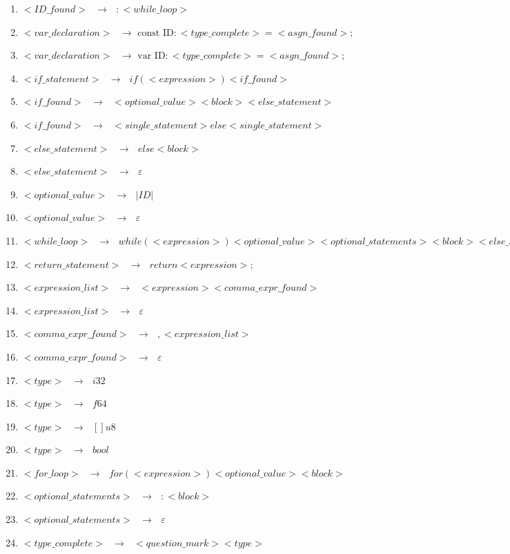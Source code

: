 \documentclass[12pt]{article}
\begin{document}
\begin{enumerate}
\item $<ID\_found> \text{ }\to \text{ } : <while\_loop>$
\item $<var\_declaration> \text{ }\to \text{ const ID} : <type\_complete> = <asgn\_found> ;$
\item $<var\_declaration> \text{ }\to \text{ var ID} : <type\_complete> = <asgn\_found> ;$
\item $<if\_statement> \text{ }\to \text{ } if ( <expression> ) <if\_found>$
\item $<if\_found> \text{ }\to \text{ } <optional\_value> <block> <else\_statement>$
\item $<if\_found> \text{ }\to \text{ } <single\_statement> else <single\_statement>$
\item $<else\_statement> \text{ }\to \text{ } else <block>$
\item $<else\_statement> \text{ }\to \text{ } \varepsilon$
\item $<optional\_value> \text{ }\to \text{ } | ID |$
\item $<optional\_value> \text{ }\to \text{ } \varepsilon$
\item $<while\_loop> \text{ }\to \text{ } while ( <expression> ) <optional\_value> <optional\_statements> <block> <else\_statement>$
\item $<return\_statement> \text{ }\to \text{ } return <expression> ;$
\item $<expression\_list> \text{ }\to \text{ } <expression> <comma\_expr\_found>$
\item $<expression\_list> \text{ }\to \text{ } \varepsilon$
\item $<comma\_expr\_found> \text{ }\to \text{ } , <expression\_list>$ 
\item $<comma\_expr\_found> \text{ }\to \text{ } \varepsilon$
\item $<type> \text{ }\to \text{ } i32$
\item $<type> \text{ }\to \text{ } f64$
\item $<type> \text{ }\to \text{ } [] u8$
\item $<type> \text{ }\to \text{ } bool$
\item $<for\_loop> \text{ }\to \text{ } for ( <expression> ) <optional\_value> <block>$
\item $<optional\_statements> \text{ }\to \text{ } : <block>$ 
\item $<optional\_statements> \text{ }\to \text{ } \varepsilon$
\item $<type\_complete> \text{ }\to \text{ } <question\_mark> <type>$

\end{enumerate}
\end{document}
